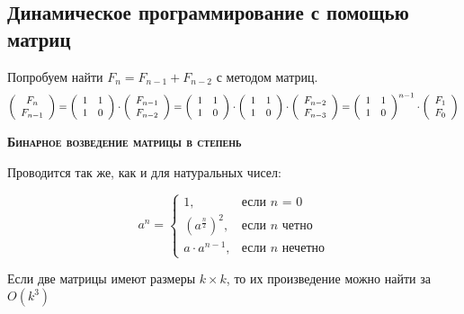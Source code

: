 \subsection{Динамическое программирование с помощью матриц}
Попробуем найти $F_n = F_{n-1} + F_{n-2}$ с методом матриц.
$$\left(\begin{array}{c}
  F_n \\
  F_{n-1}
\end{array}\right) = \left(\begin{array}{c c}
 1 & 1 \\
  1 & 0
\end{array}\right) \cdot \left(\begin{array}{c}
  F_{n-1} \\
  F_{n-2}
\end{array}\right) = \left(\begin{array}{c c}
  1 & 1 \\
   1 & 0
 \end{array}\right) \cdot \left(\begin{array}{c c}
  1 & 1 \\
   1 & 0
 \end{array}\right) \cdot \left(\begin{array}{c}
   F_{n-2} \\
   F_{n-3}
 \end{array}\right) = \left(\begin{array}{c c}
  1 & 1 \\
   1 & 0
 \end{array}\right)^{n-1}\cdot \left(\begin{array}{c}
  F_{1} \\
  F_{0}
\end{array}\right)$$

\textsc{\textbf{Бинарное возведение матрицы в степень}}

Проводится так же, как и для натуральных чисел:

\begin{equation}
  a^n =
  \begin{cases}
    1,& \text{если $n$ = 0} \\
    \left(a^{\frac{n}{2}}\right)^2,& \text{если $n$ четно}\\
    a \cdot a ^ {n-1},& \text{если $n$ нечетно}
  \end{cases}
\end{equation}

Если две матрицы имеют размеры $k \times k$, то их произведение можно найти за $O(k^3)$


